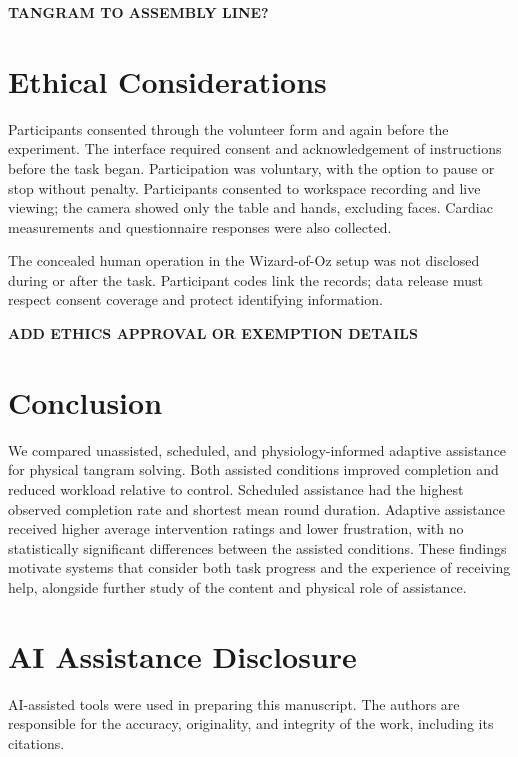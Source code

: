 \documentclass[sigconf,anonymous]{aamas}
\begin{document}
\textbf{TANGRAM TO ASSEMBLY LINE?}

\section{Ethical Considerations}

Participants consented through the volunteer form and again before the experiment. The interface required consent and acknowledgement of instructions before the task began. Participation was voluntary, with the option to pause or stop without penalty. Participants consented to workspace recording and live viewing; the camera showed only the table and hands, excluding faces. Cardiac measurements and questionnaire responses were also collected.

The concealed human operation in the Wizard-of-Oz setup was not disclosed during or after the task. Participant codes link the records; data release must respect consent coverage and protect identifying information.

\textbf{ADD ETHICS APPROVAL OR EXEMPTION DETAILS}

\section{Conclusion}

We compared unassisted, scheduled, and physiology-informed adaptive assistance for physical tangram solving. Both assisted conditions improved completion and reduced workload relative to control. Scheduled assistance had the highest observed completion rate and shortest mean round duration. Adaptive assistance received higher average intervention ratings and lower frustration, with no statistically significant differences between the assisted conditions. These findings motivate systems that consider both task progress and the experience of receiving help, alongside further study of the content and physical role of assistance.

\section*{AI Assistance Disclosure}

AI-assisted tools were used in preparing this manuscript. The authors are responsible for the accuracy, originality, and integrity of the work, including its citations.



\end{document}
